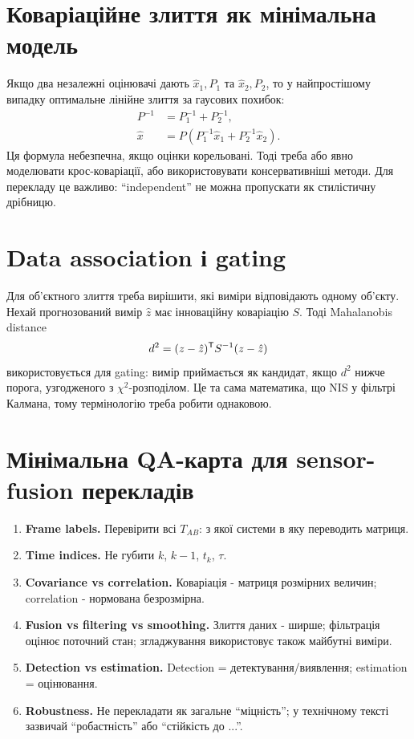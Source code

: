 \section{Коваріаційне злиття як мінімальна модель}

Якщо два незалежні оцінювачі дають $\hat{x}_1,P_1$ та $\hat{x}_2,P_2$, то у найпростішому випадку оптимальне лінійне злиття за гаусових похибок:
\begin{align}
  P^{-1} &= P_1^{-1}+P_2^{-1},\\
  \hat{x} &= P(P_1^{-1}\hat{x}_1+P_2^{-1}\hat{x}_2).
\end{align}
Ця формула небезпечна, якщо оцінки корельовані. Тоді треба або явно моделювати крос-коваріації, або використовувати консервативніші методи. Для перекладу це важливо: ``independent'' не можна пропускати як стилістичну дрібницю.

\section{Data association і gating}

Для об'єктного злиття треба вирішити, які виміри відповідають одному об'єкту. Нехай прогнозований вимір $\hat{z}$ має інноваційну коваріацію $S$. Тоді Mahalanobis distance
\begin{equation}
  d^2 = (z-\hat{z})^{\mathsf{T}} S^{-1}(z-\hat{z})
\end{equation}
використовується для gating: вимір приймається як кандидат, якщо $d^2$ нижче порога, узгодженого з $\chi^2$-розподілом. Це та сама математика, що NIS у фільтрі Калмана, тому термінологію треба робити однаковою.

\section{Мінімальна QA-карта для sensor-fusion перекладів}

\begin{enumerate}[label=\arabic*.]
\item \textbf{Frame labels.} Перевірити всі $T_{AB}$: з якої системи в яку переводить матриця.
\item \textbf{Time indices.} Не губити $k$, $k-1$, $t_k$, $\tau$.
\item \textbf{Covariance vs correlation.} Коваріація - матриця розмірних величин; correlation - нормована безрозмірна.
\item \textbf{Fusion vs filtering vs smoothing.} Злиття даних - ширше; фільтрація оцінює поточний стан; згладжування використовує також майбутні виміри.
\item \textbf{Detection vs estimation.} Detection = детектування/виявлення; estimation = оцінювання.
\item \textbf{Robustness.} Не перекладати як загальне ``міцність''; у технічному тексті зазвичай ``робастність'' або ``стійкість до ...''.
\end{enumerate}

